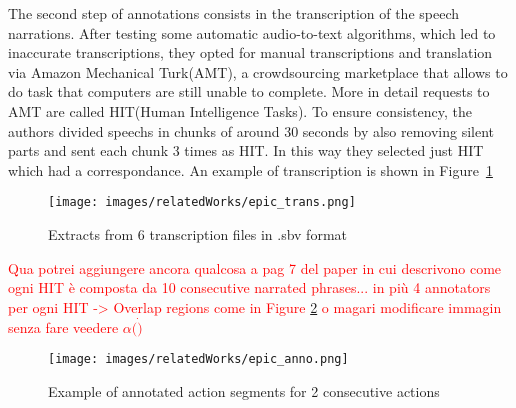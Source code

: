 The second step of annotations consists in the transcription of the speech narrations. After testing some automatic audio-to-text 
algorithms, which led to inaccurate transcriptions, they opted for manual transcriptions and translation via Amazon Mechanical Turk(AMT), a crowdsourcing
marketplace that allows to do task that computers  are still unable to complete. More in detail requests to AMT are called HIT(Human Intelligence Tasks).
To ensure consistency, the authors divided speechs in chunks of around 30 seconds by also removing silent parts and sent each chunk 3 times as HIT.
In this way they selected just HIT which had a correspondance. An example of transcription is shown in Figure~\ref{fig:epic_trans}
\begin{figure}
    \centering
    \texttt{[image: images/relatedWorks/epic\_trans.png]} %
    \caption{Extracts from 6 transcription files in .sbv format}\label{fig:epic_trans}
\end{figure}
\textcolor{red}{Qua potrei aggiungere ancora qualcosa a pag 7 del paper in cui 
descrivono come ogni HIT  è composta da 10 consecutive narrated phrases... in più
4 annotators per ogni HIT -> Overlap regions come in Figure \ref{fig:epic_anno} o
magari modificare immagin senza fare veedere $\alpha(\dot)$}
\begin{figure}
    \centering
    \texttt{[image: images/relatedWorks/epic\_anno.png]} %
    \caption{Example of annotated action segments for 2 consecutive actions}\label{fig:epic_anno}
\end{figure}

